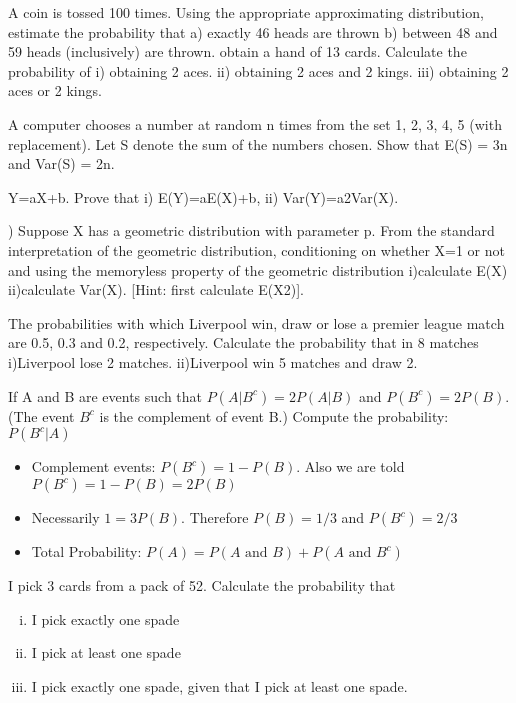 
\item A coin is tossed 100 times. Using the appropriate approximating distribution, estimate the probability that
a) exactly 46 heads are thrown
b) between 48 and 59 heads (inclusively) are thrown.
\itemI obtain a hand of 13 cards. Calculate the probability of
i) obtaining 2 aces.
ii) obtaining 2 aces and 2 kings.
iii) obtaining 2 aces or 2 kings.

\item A computer chooses a number at random n times from the set {1, 2, 3, 4, 5} (with replacement). Let S denote the sum of the numbers chosen. Show that
E(S) = 3n and Var(S) = 2n.

\itemLet Y=aX+b. Prove that i) E(Y)=aE(X)+b, ii) Var(Y)=a2Var(X).

\itema) Suppose X has a geometric distribution with parameter p. From the standard interpretation of the geometric distribution, conditioning on whether X=1 or not and using the memoryless property of the geometric distribution
i)calculate E(X)
ii)calculate Var(X). [Hint: first calculate E(X2)].

\item The probabilities with which Liverpool win, draw or lose a premier league match are 0.5, 0.3 and 0.2, respectively. Calculate the probability that in 8 matches
i)Liverpool lose 2 matches.
ii)Liverpool win 5 matches and draw 2.
\item %
If A and B are events such that $P(A|B^c) = 2P(A|B)$ and $P(B^c) = 2P(B)$.
(The event $B^c$ is the complement of event B.) Compute the probability: $P(B^c|A)$ 
\begin{framed}
\begin{itemize}
\item Complement events: $P(B^c) = 1 - P(B)$. Also we are told $P(B^c) = 1-P(B)= 2P(B)$
\item Necessarily $1 = 3P(B)$. Therefore $P(B) = 1/3$ and  $P(B^c)=2/3$
\item Total Probability: $P(A) = P(A \mbox{ and } B) + P(A \mbox{ and } B^c)$
\end{itemize}
\end{framed}

\item I pick 3 cards from a pack of 52. Calculate the probability that 
\begin{enumerate}[(i)]
\item I pick exactly one spade
\item I pick at least one spade
\item I pick exactly one spade, given that I pick at least one spade.
\end{enumerate}

